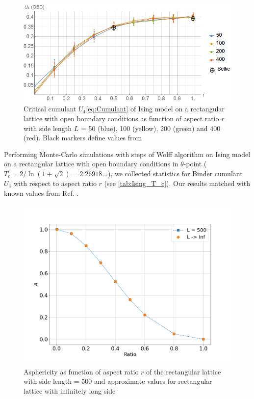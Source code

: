 \documentclass[aps,pre,amssymb,amsmath,twocolumn,floatfix]{revtex4-2}
\begin{document}
\begin{figure}[h]
    \centering
    \includegraphics[width=\columnwidth]{Images/CumulantOBC.png}
    \caption{Critical cumulant $U_{4}$\eqref{eq:Cumulant} of Ising model on a rectangular lattice with open boundary conditions as function of aspect ratio $r$ with side length $L$ = 50 (blue), 100 (yellow), 200 (green) and 400 (red). Black markers define values from \cite{Selke2006}}
    \label{fig:A_r}
\end{figure}

Performing Monte-Carlo simulations with steps of Wolff algorithm \cite{Newmanb1999} on Ising model on a rectangular lattice with open boundary conditions in $\theta$-point ($T_{c} = 2/\ln{(1 + \sqrt{2})} =  2.26918... $), we collected statistics for Binder cumulant $U_{4}$ with respect to aspect ratio $r$ (see \cref{tab:Ising_T_c}). Our results matched with known values from Ref. \cite{Selke2006}.

\begin{figure}[h]
    \centering
    \includegraphics[width=\columnwidth]{Images/A_r.png}
    \caption{Asphericity as function of aspect ratio $r$ of the rectangular lattice with side length = 500 and approximate values for rectangular lattice with infinitely long side}
    \label{fig:A_r}
\end{figure}
\end{document}
